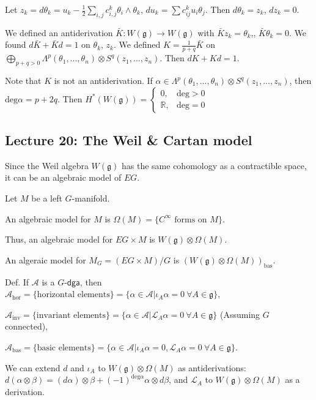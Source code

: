 \documentclass{article}
\theoremstyle{mystyle}
\theoremstyle{remark}
\numberwithin{equation}{section}
\begin{document}
Let $z_k = d\theta_k = u_k - \frac{1}{2} \sum_{i,j}c^k_{i,j}\theta_i\wedge \theta_k$, $du_k = \sum c^k_{ij}u_i\theta_j$. Then $d\theta_k = z_k$, $dz_k = 0$.

We defined an antiderivation $\bar{K}\colon W(\mathfrak{g})\rightarrow W(\mathfrak{g})$ with $\bar{K} z_k = \theta_k$,, $\bar{K}\theta_k=0$. We found $d\bar{K} + \bar{K}d = 1$ on $\theta_k$, $z_k$. We defined $K = \frac{1}{p+q}\bar{K}$ on $\bigoplus_{p+q>0} \Lambda^p(\theta_1,...,\theta_n)\otimes S^q(z_1,...,z_n)$. Then $dK + Kd = 1$. 

Note that $K$ is not an antiderivation. If $\alpha \in \Lambda^p(\theta_1,...,\theta_n) \otimes S^q(z_1,...,z_n)$, then $\mathrm{deg} \alpha = p+2q$. Then $H^*(W(\mathfrak{g})) = \left\{\begin{array}{ll} 0,& \text{deg}>0\\\mathbb{R}, & \text{deg}=0\end{array}\right.$

\subsection{Lecture 20: The Weil \& Cartan model}

Since the Weil algebra $W(\mathfrak{g})$ has the same cohomology as a contractible space, it can be an algebraic model of $EG$. 

Let $M$ be a left $G$-manifold.

An algebraic model for $M$ is $\Omega(M) = \{C^\infty\text{ forms on }M\}$. 

Thus, an algebraic model for $EG\times M$ is $W(\mathfrak{g})\otimes \Omega(M)$.

An algeraic model for $M_G = (EG\times M)/G$
is $\left(W(\mathfrak{g})\otimes \Omega(M)\right)_{\text{bas}}$.

Def. If $\mathcal{A}$ is a $G$-$\textsf{dga}$, then $\mathcal{A}_{\text{hor}} = \{\text{horizontal elements}\} = \{\alpha \in \mathcal{A}|\iota_A\alpha = 0~ \forall A \in \mathfrak{g}\}$, 

$\mathcal{A}_{\text{inv}} = \{\text{invariant elements}\}
=\{\alpha \in \mathcal{A}|\mathcal{L}_A\alpha=0~\forall A \in \mathfrak{g}\} $ (Assuming $G$ connected),


$\mathcal{A}_{\text{bas}} = \{\text{basic elements}\}
=\{\alpha \in \mathcal{A}|\iota_A\alpha=0,\mathcal{L}_A\alpha=0 ~ \forall A \in \mathfrak{g}\} $.

We can extend $d$ and $\iota_A$ to $W(\mathfrak{g})\otimes \Omega(M)$ as antiderivations: $d(\alpha\otimes \beta) = (d\alpha)\otimes \beta + (-1)^{\text{deg} \alpha} \alpha \otimes d\beta$, and $\mathcal{L}_A$ to $W(\mathfrak{g})\otimes \Omega(M)$ as a derivation. 
\end{document}
